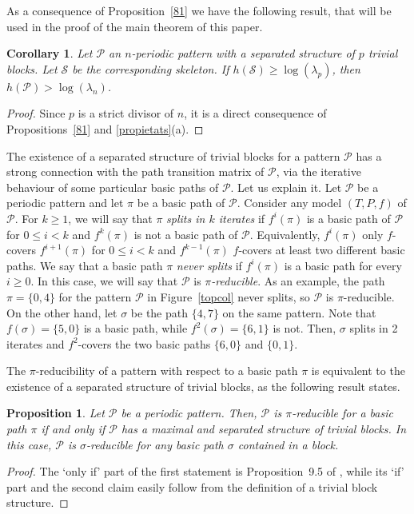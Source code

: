 \documentclass[a4paper]{amsart}
\newtheorem{proposition}[theorem]{Proposition}
\newtheorem{corollary}[theorem]{Corollary}
\theoremstyle{definition}
\begin{document}
As a consequence of Proposition~\ref{81} we have the following result, that will be used in the proof
of the main theorem of this paper.

\begin{corollary}\label{skeletonok}
Let $\mathcal{P}$ an $n$-periodic pattern with a separated structure of $p$ trivial blocks. Let
$\mathcal{S}$ be the corresponding skeleton. If $h(\mathcal{S})\ge\log(\lambda_p)$, then $h(\mathcal{P})>\log(\lambda_n)$.
\end{corollary}
\begin{proof}
Since $p$ is a strict divisor of $n$, it is a direct consequence of Propositions~\ref{81} and \ref{propietats}(a).
\end{proof}

The existence of a separated structure of trivial blocks for a pattern $\mathcal{P}$ has a strong connection with
the path transition matrix of $\mathcal{P}$, via the iterative behaviour of some particular basic paths of $\mathcal{P}$.
Let us explain it. Let $\mathcal{P}$ be a periodic pattern and let $\pi$ be a basic path of $\mathcal{P}$. Consider any
model $(T,P,f)$ of $\mathcal{P}$. For $k\ge1$,
we will say that $\pi$ \emph{splits in $k$ iterates} \label{pagesplit} if $f^i(\pi)$ is a basic path of $\mathcal{P}$ for $0\le i<k$ and $f^k(\pi)$
is not a basic path of $\mathcal{P}$. Equivalently, $f^i(\pi)$ only $f$-covers
$f^{i+1}(\pi)$ for $0\le i<k$ and $f^{k-1}(\pi)$ $f$-covers at least two different basic paths. We say that a basic path
$\pi$ \emph{never splits} if $f^i(\pi)$ is a basic path for every $i\ge0$. In this case, we will say that $\mathcal{P}$
is \emph{$\pi$-reducible}. As an example, the path $\pi=\{0,4\}$ for the pattern $\mathcal{P}$ in Figure~\ref{topcol}
never splits, so $\mathcal{P}$ is $\pi$-reducible. On the other hand, let $\sigma$ be the path $\{4,7\}$ on the same pattern. Note that
$f(\sigma)=\{5,0\}$ is a basic path, while $f^2(\sigma)=\{6,1\}$ is not. Then, $\sigma$ splits in 2 iterates and $f^2$-covers
the two basic paths $\{6,0\}$ and $\{0,1\}$.

The $\pi$-reducibility of a pattern with respect to a basic path $\pi$ is equivalent to
the existence of a separated structure of trivial blocks, as the following result states.

\begin{proposition}\label{twocharact}
Let $\mathcal{P}$ be a periodic pattern. Then, $\mathcal{P}$ is $\pi$-reducible for a basic path $\pi$ if and only if
$\mathcal{P}$ has a maximal and separated structure of trivial blocks. In this case, $\mathcal{P}$ is $\sigma$-reducible for any
basic path $\sigma$ contained in a block.
\end{proposition}
\begin{proof}
The `only if' part of the first statement is Proposition~9.5 of \cite{ajm}, while its `if' part and the second claim
easily follow from the definition of a trivial block structure.
\end{proof}
\end{document}
